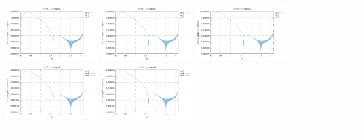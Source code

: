 \noindent
\includegraphics[width=3.5cm]{python_codes/fieldstone_152/RESULTS/exp3/vel_64_m2}
\includegraphics[width=3.5cm]{python_codes/fieldstone_152/RESULTS/exp3/vel_64_m3}
\includegraphics[width=3.5cm]{python_codes/fieldstone_152/RESULTS/exp3/vel_64_m4}
\includegraphics[width=3.5cm]{python_codes/fieldstone_152/RESULTS/exp3/vel_64_m5}
\includegraphics[width=3.5cm]{python_codes/fieldstone_152/RESULTS/exp3/vel_64_m6}

\hrule

